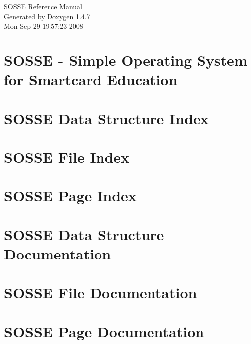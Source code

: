 \documentclass[a4paper]{article}
\begin{document}
\begin{titlepage}
\vspace*{7cm}
\begin{center}
{\Large SOSSE Reference Manual}\\
\vspace*{1cm}
{\large Generated by Doxygen 1.4.7}\\
\vspace*{0.5cm}
{\small Mon Sep 29 19:57:23 2008}\\
\end{center}
\end{titlepage}
\tableofcontents
{}
\section{SOSSE - Simple Operating System for Smartcard Education }
\label{index}
\section{SOSSE Data Structure Index}

\section{SOSSE File Index}

\section{SOSSE Page Index}

\section{SOSSE Data Structure Documentation}



\section{SOSSE File Documentation}




































\section{SOSSE Page Documentation}

\printindex
\end{document}
